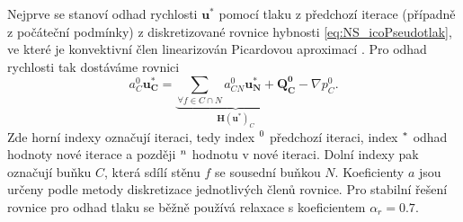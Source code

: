 Nejprve se stanoví odhad rychlosti $ \mathbf{u}^* $ pomocí tlaku z předchozí iterace (případně z počáteční podmínky) z diskretizované rovnice hybnosti \ref{eq:NS_icoPseudotlak}, ve které je konvektivní člen linearizován Picardovou aproximací \cite{furst2020mko2}. Pro odhad rychlosti tak dostáváme rovnici
\begin{equation}\label{eq:simple_odhadU}
a_C^0\mathbf{u_C^*}
=
\underbrace{\sum_{\forall f \in C\cap N} a_{CN}^0 \mathbf{u_N^*}+\mathbf{Q_C^0}}_{\mathbf{H}(\mathbf{u^*})_C}-\nabla p_C^0.
\end{equation}
Zde horní indexy označují iteraci, tedy index $ \null^0 $ předchozí iteraci, index $ \null^* $ odhad hodnoty nové iterace a později $ \null^n $ hodnotu v nové iteraci. Dolní indexy pak označují buňku $ C $, která sdílí stěnu $ f $ se sousední buňkou $ N $. Koeficienty $ a $ jsou určeny podle metody diskretizace jednotlivých členů rovnice. Pro stabilní řešení rovnice pro odhad tlaku se běžně používá relaxace s koeficientem $ \alpha_r=0.7 $.

